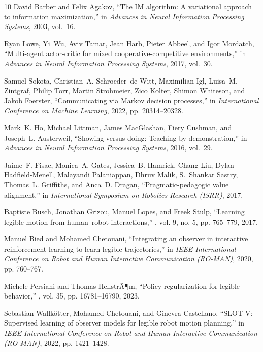 \documentclass{article}
\begin{document}
\begin{thebibliography}{10}
David Barber and Felix Agakov,
\newblock ``The IM algorithm: A variational approach to information maximization,''
\newblock in {\em Advances in Neural Information Processing Systems}, 2003, vol.~16.

Ryan Lowe, Yi~Wu, Aviv Tamar, Jean Harb, Pieter Abbeel, and Igor Mordatch,
\newblock ``Multi-agent actor-critic for mixed cooperative-competitive environments,''
\newblock in {\em Advances in Neural Information Processing Systems}, 2017, vol.~30.

Samuel Sokota, Christian~A. Schroeder~de Witt, Maximilian Igl, Luisa~M. Zintgraf, Philip Torr, Martin Strohmeier, Zico Kolter, Shimon Whiteson, and Jakob Foerster,
\newblock ``Communicating via Markov decision processes,''
\newblock in {\em International Conference on Machine Learning}, 2022, pp. 20314--20328.

Mark~K. Ho, Michael Littman, James MacGlashan, Fiery Cushman, and Joseph~L. Austerweil,
\newblock ``Showing versus doing: Teaching by demonstration,''
\newblock in {\em Advances in Neural Information Processing Systems}, 2016, vol.~29.

Jaime~F. Fisac, Monica~A. Gates, Jessica~B. Hamrick, Chang Liu, Dylan Hadfield-Menell, Malayandi Palaniappan, Dhruv Malik, S.~Shankar Sastry, Thomas~L. Griffiths, and Anca~D. Dragan,
\newblock ``Pragmatic-pedagogic value alignment,''
\newblock in {\em International Symposium on Robotics Research (ISRR)}, 2017.

Baptiste Busch, Jonathan Grizou, Manuel Lopes, and Freek Stulp,
\newblock ``Learning legible motion from human--robot interactions,''
, vol. 9, no. 5, pp. 765--779, 2017.

Manuel Bied and Mohamed Chetouani,
\newblock ``Integrating an observer in interactive reinforcement learning to learn legible trajectories,''
\newblock in {\em IEEE International Conference on Robot and Human Interactive Communication (RO-MAN)}, 2020, pp. 760--767.

Michele Persiani and Thomas HellstrÃ¶m,
\newblock ``Policy regularization for legible behavior,''
, vol. 35, pp. 16781--16790, 2023.

Sebastian Wallk{\"o}tter, Mohamed Chetouani, and Ginevra Castellano,
\newblock ``{SLOT-V}: Supervised learning of observer models for legible robot motion planning,''
\newblock in {\em IEEE International Conference on Robot and Human Interactive Communication (RO-MAN)}, 2022, pp. 1421--1428.


\end{thebibliography}
\end{document}

